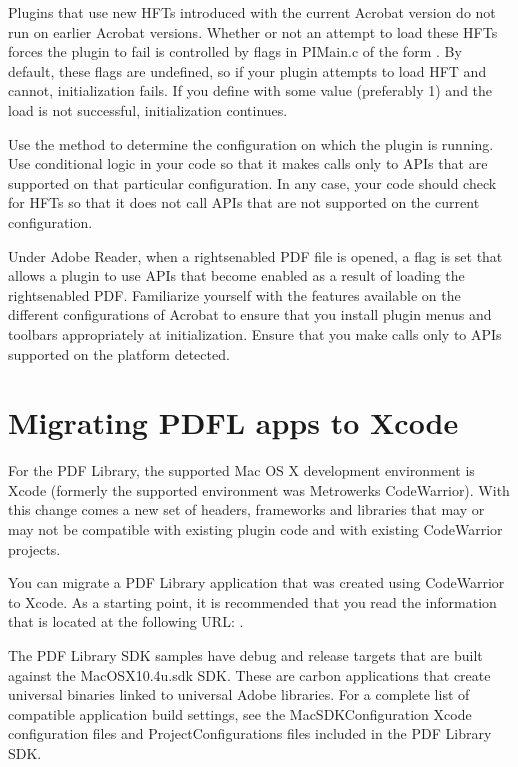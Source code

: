 \documentclass[letterpaper,12pt,english,openany,oneside]{sphinxmanual}
\begin{document}
Plugins that use new HFTs introduced with the current Acrobat version do not run on earlier Acrobat versions. Whether or not an attempt to load these HFTs forces the plugin to fail is controlled by flags in PIMain.c of the form . By default, these flags are undefined, so if your plugin attempts to load HFT and cannot, initialization fails. If you define  with some value (preferably 1) and the load is not successful, initialization continues.

Use the  method to determine the configuration on which the plugin is running. Use conditional logic in your code so that it makes calls only to APIs that are supported on that particular configuration. In any case, your code should check for  HFTs so that it does not call APIs that are not supported on the current configuration.

Under Adobe Reader, when a rights\sphinxhyphen{}enabled PDF file is opened, a flag is set that allows a plugin to use APIs that become enabled as a result of loading the rights\sphinxhyphen{}enabled PDF. Familiarize yourself with the features available on the different configurations of Acrobat to ensure that you install plugin menus and toolbars appropriately at initialization. Ensure that you make calls only to APIs supported on the platform detected.


\section{Migrating PDFL apps to Xcode}
\label{\detokenize{Plugins_CreatingSimplePlug:migrating-pdfl-apps-to-xcode}}
For the PDF Library, the supported Mac OS X development environment is Xcode (formerly the supported environment was Metrowerks CodeWarrior). With this change comes a new set of headers, frameworks and libraries that may or may not be compatible with existing plugin code and with existing CodeWarrior projects.

You can migrate a PDF Library application that was created using CodeWarrior to Xcode. As a starting point, it is recommended that you read the information that is located at the following URL: .

The PDF Library SDK samples have debug and release targets that are built against the MacOSX10.4u.sdk SDK. These are carbon applications that create universal binaries linked to universal Adobe libraries. For a complete list of compatible application build settings, see the MacSDKConfiguration Xcode configuration files and ProjectConfigurations files included in the PDF Library SDK.
\end{document}
